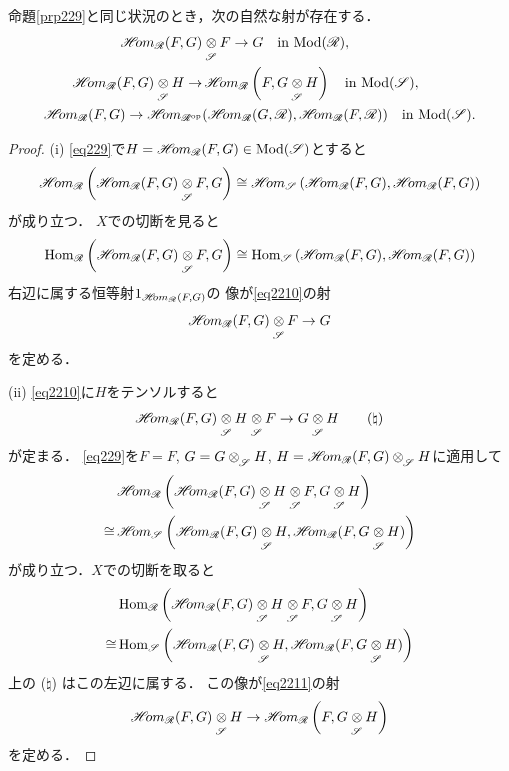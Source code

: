 \begin{CRL}
    命題\ref{prp229}と同じ状況のとき，次の自然な射が存在する．
    \begin{align}
        \HOM_{\scR}(F,G)&\ttens[\scS]F\to G\quad\text{in \(\Mod(\scR)\)},\label{eq2210}\\
        \HOM_{\scR}(F,G)\ttens[\scS]H
        \to&\HOM_{\scR}\left(F,G\ttens[\scS]H\right)
        \quad\text{in \(\Mod(\scS)\)},\label{eq2211}\\
        \HOM_{\scR}(F,G)
        \to
        \HOM_{\scR^{\op}}&(
            \HOM_{\scR}(G,\scR),\HOM_{\scR}(F,\scR)
        )\quad\text{in \(\Mod(\scS)\)}.\label{eq2212}
    \end{align}
\end{CRL}
\begin{proof}
    (i) 
    \eqref{eq229}で\(H=\mathop{\mathscr{H}\hspace{-2pt}om}\nolimits_{\mathscr{R}}(F,G)\in\mathop{\mathrm{Mod}}\nolimits(\mathscr{S})\)とすると
    \[
        \HOM_{\scR}\left(\HOM_{\scR}(F,G)\ttens[\scS]F,G\right)
        \cong
        \HOM_{\scS}\left(\HOM_{\scR}(F,G),\HOM_{\scR}(F,G)\right)
    \]
    が成り立つ．
    \(X\)での切断を見ると
    \[
        \Hom_{\scR}\left(\HOM_{\scR}(F,G)\ttens[\scS]F,G\right)
        \cong
        \Hom_{\scS}\left(\HOM_{\scR}(F,G),\HOM_{\scR}(F,G)\right)
    \]
    右辺に属する恒等射\(1_{\mathop{\mathscr{H}\hspace{-2pt}om}\nolimits_{\mathscr{R}}(F,G)}\)の
    像が\eqref{eq2210}の射\[
        \HOM_{\scR}(F,G)\ttens[\scS]F\to G
    \]を定める．

    (ii) 
    \eqref{eq2210}に\(H\)をテンソルすると
    \[
        \HOM_{\scR}(F,G)\ttens[\scS]H\ttens[\scS]F\to G\ttens[\scS]H\tag*{(\(\natural\))}
    \]
    が定まる．
    \eqref{eq229}を\(F=F\), \(G=G\ttens[\scS]H\), 
    \(H=\HOM_{\scR}(F,G)\ttens[\scS]H\)に適用して
    \begin{align*}
        &\HOM_{\scR}\left(\HOM_{\scR}(F,G)\ttens[\scS]H\ttens[\scS]F,G\ttens[\scS]H\right)\\
        \cong
        &\HOM_{\scS}\left(\HOM_{\scR}(F,G)\ttens[\scS]H,\HOM_{\scR}(F,G\ttens[\scS]H)\right)
    \end{align*}
    が成り立つ．\(X\)での切断を取ると
    \begin{align*}
        &\Hom_{\scR}\left(\HOM_{\scR}(F,G)\ttens[\scS]H\ttens[\scS]F,G\ttens[\scS]H\right)\\
        \cong
        &\Hom_{\scS}\left(\HOM_{\scR}(F,G)\ttens[\scS]H,\HOM_{\scR}(F,G\ttens[\scS]H)\right)
    \end{align*}
    上の (\(\natural\)) はこの左辺に属する．
    この像が\eqref{eq2211}の射\[
        \HOM_{\scR}(F,G)\ttens[\scS]H
        \to
        \HOM_{\scR}\left(F,G\ttens[\scS]H\right)
    \]
    を定める．


\end{proof}
